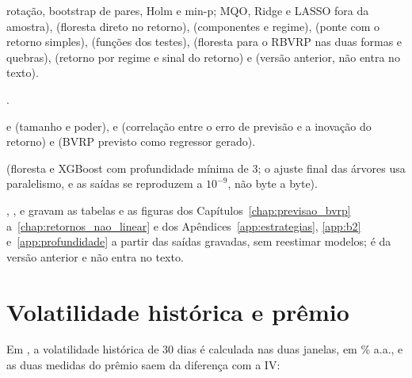 \begin{description}
          rotação, bootstrap de pares, Holm e min-p; MQO, Ridge e LASSO fora
          da amostra), 
          (floresta direto no retorno),
          (componentes e regime),
           (ponte com o
          retorno simples),  (funções dos testes),
           (floresta para o RBVRP nas duas
          formas e quebras),  (retorno por regime
          e sinal do retorno) e  (versão
          anterior, não entra no texto).
    \item[Apêndice~\ref{app:estrategias}.] .
    \item[Apêndice~\ref{app:b2}.]
           e
           (tamanho e poder),
           e
           (correlação entre o
          erro de previsão e a inovação do retorno) e
           (BVRP
          previsto como regressor gerado).
    \item[Apêndice~\ref{app:profundidade}.]
          (floresta e XGBoost com profundidade mínima de 3; o ajuste final
          das árvores usa paralelismo, e as saídas se reproduzem a $10^{-9}$,
          não byte a byte).
    \item[Geradores.] ,
          ,  e
           gravam
          as tabelas e as figuras dos
          Capítulos~\ref{chap:previsao_bvrp} a~\ref{chap:retornos_nao_linear}
          e dos Apêndices~\ref{app:estrategias}, \ref{app:b2} e~\ref{app:profundidade} a partir das saídas gravadas, sem
          reestimar modelos;  é da versão
          anterior e não entra no texto.
\end{description}

\section{Volatilidade histórica e prêmio}

Em , a volatilidade histórica de 30 dias é
calculada nas duas janelas, em \% a.a., e as duas medidas do prêmio saem da
diferença com a IV:

